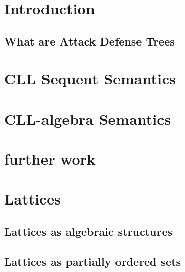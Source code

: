 \maketitle



\section{Introduction}





\subsection{What are Attack Defense Trees}




\section{CLL Sequent Semantics}


\section{CLL-algebra Semantics}






% 
%



% 
% 
% 


\section{further work}


\appendix 

\section{Lattices}




	\subsection{Lattices as algebraic structures}
		
	\subsection{Lattices as partially ordered sets}
		





 
